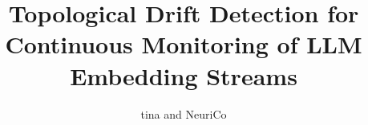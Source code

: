 \documentclass{article}
\title{Topological Drift Detection for Continuous Monitoring of LLM Embedding Streams}
\author{tina and NeuriCo}
\begin{document}
\maketitle

\begin{abstract}

\end{abstract}










\end{document}
